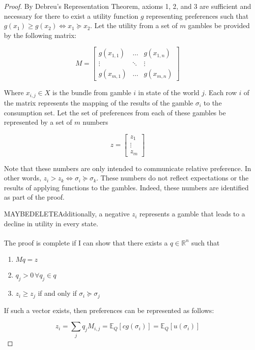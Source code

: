 \documentclass{article}
\begin{document}
\begin{proof}
By Debreu's Representation Theorem, axioms 1, 2, and 3 are sufficient and necessary for there to exist a utility function \(g\) representing preferences such that \(g(x_1)\geq g(x_2) \Leftrightarrow x_1 \succeq x_2 \).  Let the utility from a set of \(m\) gambles be provided by the following matrix:

\[M=\begin{bmatrix}
	g(x_{1, 1}) & \ldots & g(x_{1, n})\\
	\vdots & \ddots & \vdots \\
	g(x_{m, 1}) & \ldots & g(x_{m, n})
\end{bmatrix}
\]

Where \(x_{i, j} \in X\) is the bundle from gamble \(i\) in state of the world \(j\).  Each row  \(i\) of the matrix represents the mapping of the results of the gamble \(\sigma_i\) to the consumption set. Let the set of preferences from each of these gambles be represented by a set of \(m\) numbers

\[z=\begin{bmatrix}
z_1 \\ \vdots\\ z_m
\end{bmatrix}\]


Note that these numbers are only intended to communicate relative preference.  In other words, \(z_i > z_k \Leftrightarrow \sigma_i \succeq \sigma_k\).  These numbers do not reflect expectations or the results of applying functions to the gambles.  Indeed, these numbers are identified as part of the proof.

MAYBEDELETEAdditionally, a negative \(z_i\) represents a gamble that leads to a decline in utility in every state.   
\\
\\
The proof is complete if I can show that there exists a \(q \in \mathbb{R}^n\) such that 
\begin{enumerate}
	\item \(Mq=z\)
	\item \(q_j>0 \, \forall q_j \in q\)
	\item \(z_i \geq z_j\) if and only if \(\sigma_i \succeq \sigma_j\)
\end{enumerate}

If such a vector exists, then preferences can be represented as follows:

\[z_i=\sum_j q_j M_{i, j} = \mathbb{E}_Q \left[ c g(\sigma_i) \right] =\mathbb{E}_Q\left[u(\sigma_i)\right] \]


\end{proof}
\end{document}
